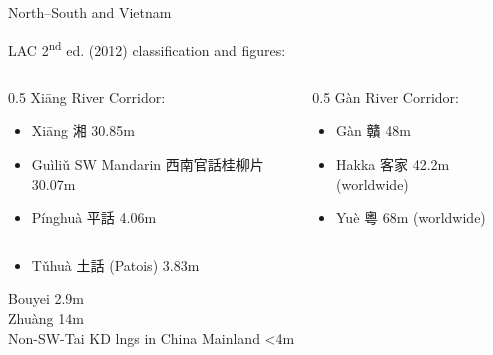 \documentclass{beamer}
\begin{document}
\begin{frame}[fragile]{North–South and Vietnam}

LAC 2\textsuperscript{nd} ed. (2012) classification and figures:

\bigskip
\begin{columns}
    \begin{column}{0.5\textwidth}
        Xiāng River Corridor:\\
        \begin{itemize}
            \item Xiāng 湘 30.85m 
            \item Guìliǔ SW Mandarin 西南官話桂柳片 30.07m
            \item Pínghuà 平話 4.06m
        \end{itemize}
    \end{column}
    \begin{column}{0.5\textwidth}
        Gàn River Corridor:\\
        \begin{itemize}
            \item Gàn 贛 48m
            \item Hakka 客家 42.2m (worldwide)
            \item Yuè 粵 68m (worldwide)
        \end{itemize}
    \end{column}
\end{columns}
\begin{center}
        \begin{minipage}{0.5\textwidth}
            \begin{itemize}
                \item Tǔhuà 土話 (Patois) 3.83m
            \end{itemize}
        \end{minipage}
    \end{center}
\bigskip
Bouyei 2.9m\\
Zhuàng 14m\\
Non-SW-Tai KD lngs in China Mainland <4m\\  

\end{frame}
\end{document}
